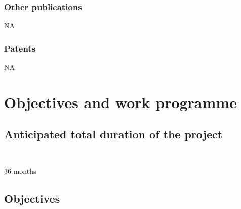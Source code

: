 \documentclass[11pt]{article}
\providecommand{\currfilename}{}
\newcommand{\myparagraph}[1]{\paragraph{#1}\mbox{}\\}
\newcommand{\showfile}{{\bf \tt \color{blue} \currfilename}}
\newcommand{\note}[1]{{\it \color{red} #1}}
\newcommand{\note}[1]{}
\newcommand{\showfile}{}
\begin{document}
\subsubsection{Other publications}
NA

\subsubsection{Patents}
NA






\section{Objectives and work programme}
\subsection{Anticipated total duration of the project}
\showfile

 36 months

\subsection{Objectives}
\showfile

\end{document}

